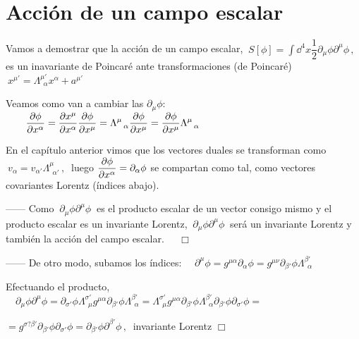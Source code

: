 \section{Acción de un campo escalar}

Vamos a demostrar que la acción de un campo escalar, $\ S[\phi]= \displaystyle \int \dd^4 x \dfrac 1 2 \partial_\mu \phi \partial^\mu  \phi\, , \ $ es un inavariante de Poincaré ante transformaciones (de Poincaré) $\ x^{\mu'}=\Lambda^{\mu'}_{\ \ \alpha} x^\alpha + a^{\mu'}$

Veamos como van a cambiar las $\partial_\mu \phi$:
$\qquad \displaystyle \pdv{\phi}{x^\alpha}=\pdv{x^\mu}{x^\alpha}\pdv{\phi}{x^\mu}=\Lambda^\mu_{\ \ \alpha} \pdv{\phi}{x^\mu}= \pdv{\phi}{x^\mu} \Lambda^\mu_{\ \ \alpha} $

En el capítulo anterior vimos que los vectores duales se transforman como $\ v_\alpha=v_{\alpha'}\Lambda^{\mu}_{\ \ \alpha'}\, , \ $ luego $\displaystyle \pdv{\phi}{x^\alpha}=\partial_\alpha \phi$ se compartan como tal, como vectores covariantes Lorentz (índices abajo).

------ Como $\ \partial_\mu \phi \partial^\mu \phi \ $ es el producto escalar de un vector consigo mismo y el producto escalar es un invariante Lorentz, $\ \partial_\mu \phi \partial^\mu \phi \ $ será un invariante Lorentz y también la acción del campo escalar.$\quad \ \ \Box$


------ De otro modo, subamos los índices: $\quad \partial^\mu \phi=g^{\mu \alpha} \partial_\alpha \phi=g^{\mu \nu} \partial_{\beta'} \phi \Lambda^{\beta'}_{\ \ \alpha}$

\hspace{1cm} Efectuando el producto, $\quad \partial_\mu \phi \partial^\mu \phi=\partial_{\sigma'} \phi \Lambda^{\sigma'}_{\ \ \mu} g^{\mu \alpha} \partial_{\beta'} \phi \Lambda^{\beta'}_{\ \ \alpha}= \Lambda^{\sigma'}_{\ \ \mu} g^{\mu \alpha} \partial_{\beta'} \phi \Lambda^{\beta'}_{\ \ \alpha}  \partial_{\beta'} \phi  \partial_{\sigma'} \phi = $
 
\hspace{1cm}  $=g^{\sigma? \beta'} \partial_{\beta'} \phi \partial_{\sigma'} \phi = \partial_{\beta'} \phi \partial^{\beta'} \phi \, , \  $ invariante Lorentz \hspace{7.5cm} $ \Box$

\vspace{10mm}

